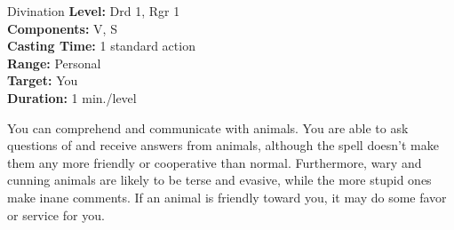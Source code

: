 {Divination}
{
	\textbf{Level:}
	Drd 1, Rgr 1\\
	\textbf{Components:}
	V, S\\
	\textbf{Casting Time:}
	1 standard action\\
	\textbf{Range:}
	Personal\\
	\textbf{Target:}
	You\\
	\textbf{Duration:}
	1 min./level\\
}
{
	You can comprehend and communicate with animals. You are able to ask questions of and receive answers from animals, although the spell doesn't make them any more friendly or cooperative than normal. Furthermore, wary and cunning animals are likely to be terse and evasive, while the more stupid ones make inane comments. If an animal is friendly toward you, it may do some favor or service for you.

}
